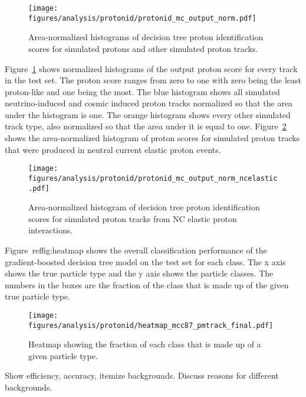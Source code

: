     \begin{figure}[ht]
      \centering
      \texttt{[image: figures/analysis/protonid/protonid\_mc\_output\_norm.pdf]}
      \caption{Area-normalized histograms of decision tree proton
      identification scores for simulated protons and other simulated proton
      tracks.}
      \label{fig:pidmcout}
    \end{figure}
    Figure~\ref{fig:pidmcout} shows normalized histograms of the output proton
    score for every track in the test set. The proton score ranges from zero to
    one with zero being the least proton-like and one being the most. The blue
    histogram shows all simulated neutrino-induced and cosmic induced proton
    tracks normalized so that the area under the histogram is one. The orange
    histogram shows every other simulated track type, also normalized so that
    the area under it is equal to one. Figure~\ref{fig:pidmcoutNCE} shows the
    area-normalized histogram of proton scores for simulated proton tracks that
    were produced in neutral current elastic proton events.
    \begin{figure}[ht]
      \centering
      \texttt{[image: figures/analysis/protonid/protonid\_mc\_output\_norm\_ncelastic.pdf]}
      \caption{Area-normalized histogram of decision tree proton identification
      scores for simulated proton tracks from NC elastic proton interactions.}
      \label{fig:pidmcoutNCE}
    \end{figure}

    Figure~ref{fig:heatmap} shows the overall classification performance of the
    gradient-boosted decision tree model on the test set for each class. The x
    axis shows the true particle type and the y axis shows the particle
    classes. The numbers in the boxes are the fraction of the class that is
    made up of the given true particle type.
    \begin{figure}[ht]
      \centering
      \texttt{[image: figures/analysis/protonid/heatmap\_mcc87\_pmtrack\_final.pdf]}
      \caption{Heatmap showing the fraction of each class that is made up of a
      given particle type.}
      \label{fig:heatmap}
    \end{figure}


    Show efficiency, accuracy, itemize backgrounds.
    Discuss reasons for different backgrounds.


